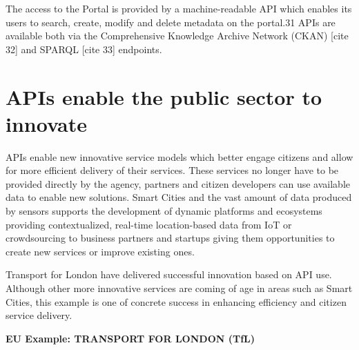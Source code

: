 The access to the Portal is provided by a machine-readable API which enables its
users to search, create, modify and delete metadata on the portal.31 APIs are
available both via the Comprehensive Knowledge Archive Network (CKAN) [cite 32] and
SPARQL [cite 33] endpoints.

\section{APIs enable the public sector to innovate}

APIs enable new innovative service models which better engage citizens and allow
for more efficient delivery of their services. These services no longer have to
be provided directly by the agency, partners and citizen developers can use
available data to enable new solutions. Smart Cities and the vast amount of data
produced by sensors supports the development of dynamic platforms and ecosystems
providing contextualized, real-time location-based data from IoT or crowdsourcing
to business partners and startups giving them opportunities to create new services
or improve existing ones.

Transport for London have delivered successful innovation based on API use.
Although other more innovative services are coming of age in areas such as
Smart Cities, this example is one of concrete success in enhancing efficiency
and citizen service delivery.

\textbf{EU Example: TRANSPORT FOR LONDON (TfL)}

